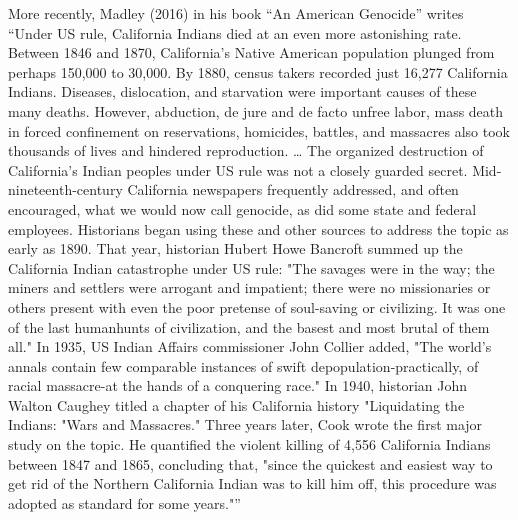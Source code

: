 More recently, Madley (2016) in his book “An American Genocide” writes “Under US rule, California Indians died at an even more astonishing rate. Between 1846 and 1870, California's Native American population plunged from perhaps 150,000 to 30,000. By 1880, census takers recorded just 16,277 California Indians. Diseases, dislocation, and starvation were important causes of these many deaths. However, abduction, de jure and de facto unfree labor, mass death in forced confinement on reservations, homicides, battles, and massacres also took thousands of lives and hindered reproduction. … The organized destruction of California's Indian peoples under US rule was not a closely guarded secret. Mid-nineteenth-century California newspapers frequently addressed, and often encouraged, what we would now call genocide, as did some state and federal employees. Historians began using these and other sources to address the topic as early as 1890. That year, historian Hubert Howe Bancroft summed up the California Indian catastrophe under US rule: "The savages were in the way; the miners and settlers were arrogant and impatient; there were no missionaries or others present with even the poor pretense of soul-saving or civilizing. It was one of the last humanhunts of civilization, and the basest and most brutal of them all." In 1935, US Indian Affairs commissioner John Collier added, "The world's annals contain few comparable instances of swift depopulation-practically, of racial massacre-at the hands of a conquering race." In 1940, historian John Walton Caughey titled a chapter of his California history "Liquidating the Indians: "Wars and Massacres." Three years later, Cook wrote the first major study on the topic. He quantified the violent killing of 4,556 California Indians between 1847 and 1865, concluding that, "since the quickest and easiest way to get rid of the Northern California Indian was to kill him off, this procedure was adopted as standard for some years."”

